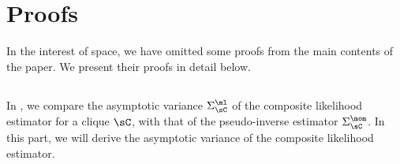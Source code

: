 \section{Proofs}
\label{app:proofs}

In the interest of space, we have omitted some proofs from
the main contents of the paper. 
We present their proofs in detail below.

\subsection{}
\label{app:pw-variance-proof}

In , we compare the asymptotic variance
  $\Sigma^\ml_\sC$ of the composite likelihood estimator for a clique
  $\sC$, with that of the pseudo-inverse estimator $\Sigma^\mom_\sC$. 
In this part, we will derive the asymptotic variance of the composite
  likelihood estimator.

